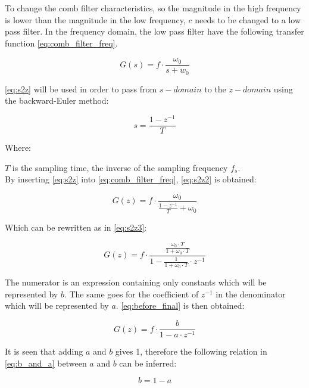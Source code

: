 To change the comb filter characteristics, so the magnitude in the high frequency is lower than the magnitude in the low frequency, $c$ needs to be changed to a low pass filter. In the frequency domain, the low pass filter have the following transfer function \autoref{eq:comb_filter_freq}. 

\begin{equation}\label{eq:comb_filter_freq}
	G(s) = f \cdot \frac{\omega_{0}}{s+w_{0}}
\end{equation}

\autoref{eq:s2z} will be used in order to pass from $s-domain$ to the $z-domain$ using the backward-Euler method:

\begin{equation}\label{eq:s2z}
	s = \frac{1-z^{-1}}{T}
\end{equation}

Where:

$T$ is the sampling time, the inverse of the sampling frequency $f_{s}$. \\

By inserting \autoref{eq:s2z} into \autoref{eq:comb_filter_freq}, \autoref{eq:s2z2} is obtained:

\begin{equation}\label{eq:s2z2}
	G(z) = f \cdot \frac{\omega_{0}}{\frac{1 - z^{-1}}{T} + \omega_{0}}
\end{equation}

Which can be rewritten as in \autoref{eq:s2z3}:

\begin{equation}\label{eq:s2z3}
	G(z) = f \cdot \frac{\frac{\omega_{0} \cdot T}{1 + \omega_{0} \cdot T}}{1 - \frac{1}{1+ \omega_{0} \cdot T} \cdot z^{-1}}
\end{equation}

The numerator is an expression containing only constants which will be represented by $b$. The same goes for the coefficient of $z^{-1}$ in the denominator which will be represented by $a$. \autoref{eq:before_final} is then obtained:

\begin{equation}\label{eq:before_final}
	G(z) = f \cdot \frac{b}{1 - a \cdot z^{-1}}
\end{equation}

It is seen that adding $a$ and $b$ gives 1, therefore the following relation in \autoref{eq:b_and_a} between $a$ and $b$ can be inferred:

\begin{equation}\label{eq:b_and_a}
	b = 1 - a
\end{equation} 

